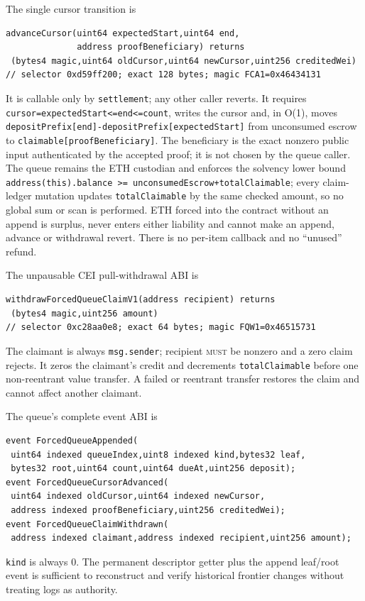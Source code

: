 \documentclass[a4paper,11pt]{article}
\newcommand{\code}[1]{\nolinkurl{#1}}
\newcommand{\must}{\textsc{must}}
\begin{document}
The single cursor transition is
\begin{verbatim}
advanceCursor(uint64 expectedStart,uint64 end,
              address proofBeneficiary) returns
 (bytes4 magic,uint64 oldCursor,uint64 newCursor,uint256 creditedWei)
// selector 0xd59ff200; exact 128 bytes; magic FCA1=0x46434131
\end{verbatim}
It is callable only by \code{settlement}; any other caller reverts.  It
requires \code{cursor=expectedStart<=end<=count}, writes the cursor and, in
O(1), moves \code{depositPrefix[end]-depositPrefix[expectedStart]} from
unconsumed escrow to \code{claimable[proofBeneficiary]}.  The beneficiary is
the exact nonzero public input authenticated by the accepted proof; it is
not chosen by the queue caller.  The queue remains the ETH custodian and
enforces the solvency lower bound
\code{address(this).balance >= unconsumedEscrow+totalClaimable}; every
claim-ledger mutation updates \code{totalClaimable} by the same checked
amount, so no global sum or scan is performed.  ETH forced into the contract
without an append is surplus, never enters either liability and cannot make
an append, advance or withdrawal revert.  There is no per-item callback and
no ``unused'' refund.

The unpausable CEI pull-withdrawal ABI is
\begin{verbatim}
withdrawForcedQueueClaimV1(address recipient) returns
 (bytes4 magic,uint256 amount)
// selector 0xc28aa0e8; exact 64 bytes; magic FQW1=0x46515731
\end{verbatim}
The claimant is always \code{msg.sender}; recipient \must{} be nonzero and a
zero claim rejects.  It zeros the claimant's credit and decrements
\code{totalClaimable} before one non-reentrant value transfer.  A failed or
reentrant transfer restores the claim and cannot affect another claimant.

The queue's complete event ABI is
\begin{verbatim}
event ForcedQueueAppended(
 uint64 indexed queueIndex,uint8 indexed kind,bytes32 leaf,
 bytes32 root,uint64 count,uint64 dueAt,uint256 deposit);
event ForcedQueueCursorAdvanced(
 uint64 indexed oldCursor,uint64 indexed newCursor,
 address indexed proofBeneficiary,uint256 creditedWei);
event ForcedQueueClaimWithdrawn(
 address indexed claimant,address indexed recipient,uint256 amount);
\end{verbatim}
\code{kind} is always 0.  The permanent descriptor getter plus the append
leaf/root event is sufficient to reconstruct and verify historical frontier
changes without treating logs as authority.
\end{document}
